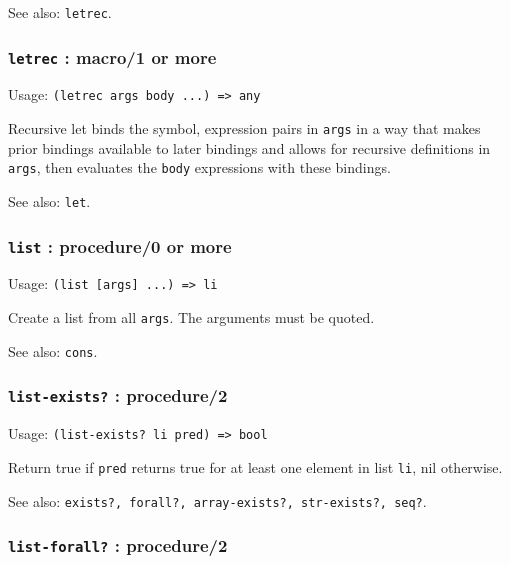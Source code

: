 \documentclass[
]{article}
\newcommand{\passthrough}[1]{#1}
\begin{document}
See also: \passthrough{\lstinline!letrec!}.

\hypertarget{letrec-macro1-or-more}{%
\subsubsection{\texorpdfstring{\texttt{letrec} : macro/1 or
more}{letrec : macro/1 or more}}\label{letrec-macro1-or-more}}

Usage: \passthrough{\lstinline!(letrec args body ...) => any!}

Recursive let binds the symbol, expression pairs in
\passthrough{\lstinline!args!} in a way that makes prior bindings
available to later bindings and allows for recursive definitions in
\passthrough{\lstinline!args!}, then evaluates the
\passthrough{\lstinline!body!} expressions with these bindings.

See also: \passthrough{\lstinline!let!}.

\hypertarget{list-procedure0-or-more}{%
\subsubsection{\texorpdfstring{\texttt{list} : procedure/0 or
more}{list : procedure/0 or more}}\label{list-procedure0-or-more}}

Usage: \passthrough{\lstinline!(list [args] ...) => li!}

Create a list from all \passthrough{\lstinline!args!}. The arguments
must be quoted.

See also: \passthrough{\lstinline!cons!}.

\hypertarget{list-exists-procedure2}{%
\subsubsection{\texorpdfstring{\texttt{list-exists?} :
procedure/2}{list-exists? : procedure/2}}\label{list-exists-procedure2}}

Usage: \passthrough{\lstinline!(list-exists? li pred) => bool!}

Return true if \passthrough{\lstinline!pred!} returns true for at least
one element in list \passthrough{\lstinline!li!}, nil otherwise.

See also:
\passthrough{\lstinline!exists?, forall?, array-exists?, str-exists?, seq?!}.

\hypertarget{list-forall-procedure2}{%
\subsubsection{\texorpdfstring{\texttt{list-forall?} :
procedure/2}{list-forall? : procedure/2}}\label{list-forall-procedure2}}
\end{document}
